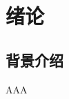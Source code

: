 \documentclass{book}
\begin{document}
\chapter{绪论}
\section{背景介绍}
\begin{theorem}
AAA
\end{theorem}
\end{document}
